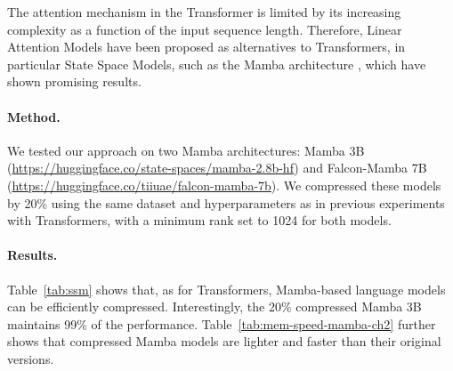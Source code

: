 The attention mechanism in the Transformer is limited by its increasing complexity as a function of the input sequence length.
Therefore, Linear Attention Models have been proposed as alternatives to Transformers, in particular State Space Models, such as the Mamba architecture \citep{gu2024mambalineartimesequencemodeling}, which have shown promising results.

\paragraph{Method.} We tested our approach on two Mamba architectures: Mamba
3B \citep{gu2024mambalineartimesequencemodeling} (\url{https://huggingface.co/state-spaces/mamba-2.8b-hf}) and Falcon-Mamba 7B (\url{https://huggingface.co/tiiuae/falcon-mamba-7b}).
We compressed these models by 20\% using the same dataset and hyperparameters as in previous experiments with Transformers, with a minimum rank set to 1024 for both models.

\paragraph{Results.} Table~\ref{tab:ssm} shows that, as for Transformers, Mamba-based language models can be efficiently compressed. Interestingly, the 20\% compressed Mamba 3B maintains 99\% of the performance.
Table~\ref{tab:mem-speed-mamba-ch2} further shows that compressed Mamba models are lighter and faster than their original versions.
\begin{table}[h!]
    \centering
    \caption{\textbf{Mamba-based language models can be efficiently compressed}. Zero-shot evaluation results for the non-compressed (0\%) and for the compressed Mamba-based language models (20\%).}
    \label{tab:ssm}
\end{table}

